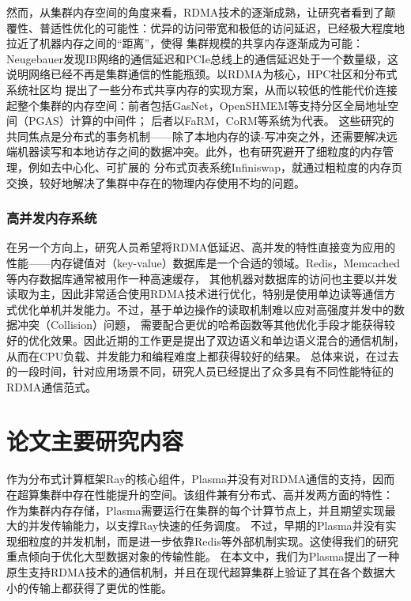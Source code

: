 然而，从集群内存空间的角度来看，RDMA技术的逐渐成熟，让研究者看到了颠覆性、普适性优化的可能性：优异的访问带宽和极低的访问延迟，已经极大程度地拉近了机器内存之间的“距离”，使得
集群规模的共享内存逐渐成为可能：Neugebauer\cite{neugebauer2018understanding}发现IB网络的通信延迟和PCIe总线上的通信延迟处于一个数量级，这说明网络已经不再是集群通信的性能瓶颈。以RDMA为核心，HPC社区和分布式系统社区均
提出了一些分布式共享内存的实现方案，从而以较低的性能代价连接起整个集群的内存空间：前者包括GasNet\cite{bonachea2017gasnet}，OpenSHMEM\cite{chapman2010introducing}等支持分区全局地址空间（PGAS）计算的中间件；
后者以FaRM\cite{dragojevic2014farm}，CoRM\cite{taranov2021corm}等系统为代表。
这些研究的共同焦点是分布式的事务机制——除了本地内存的读-写冲突之外，还需要解决远端机器读写和本地访存之间的数据冲突。此外，也有研究避开了细粒度的内存管理，例如去中心化、可扩展的
分布式页表系统Infiniswap\cite{gu2017efficient}，就通过粗粒度的内存页交换，较好地解决了集群中存在的物理内存使用不均的问题。

\subsubsection{高并发内存系统}

在另一个方向上，研究人员希望将RDMA低延迟、高并发的特性直接变为应用的性能——内存键值对（key-value）数据库是一个合适的领域。Redis\cite{redis}，Memcached\cite{jose2011memcached}等内存数据库通常被用作一种高速缓存，
其他机器对数据库的访问也主要以并发读取为主，因此非常适合使用RDMA技术进行优化，特别是使用单边读等通信方式优化单机并发能力\cite{mitchell2013using}。不过，基于单边操作的读取机制难以应对高强度并发中的数据冲突（Collision）问题，
需要配合更优的哈希函数\cite{pagh2004cuckoo}等其他优化手段才能获得较好的优化效果。因此近期的工作更是提出了双边语义和单边语义混合的通信机制\cite{kalia2014using}\cite{su2017rfp}，从而在CPU负载、并发能力和编程难度上都获得较好的结果。
总体来说，在过去的一段时间，针对应用场景不同，研究人员已经提出了众多具有不同性能特征的RDMA通信范式\cite{li2021hatrpc}。

\section{论文主要研究内容}

作为分布式计算框架Ray的核心组件，Plasma并没有对RDMA通信的支持，因而在超算集群中存在性能提升的空间。该组件兼有分布式、高并发两方面的特性：
作为集群内存存储，Plasma需要运行在集群的每个计算节点上，并且期望实现最大的并发传输能力，以支撑Ray快速的任务调度。
不过，早期的Plasma并没有实现细粒度的并发机制，而是进一步依靠Redis等外部机制实现。这使得我们的研究重点倾向于优化大型数据对象的传输性能。
在本文中，我们为Plasma提出了一种原生支持RDMA技术的通信机制，并且在现代超算集群上验证了其在各个数据大小的传输上都获得了更优的性能。

